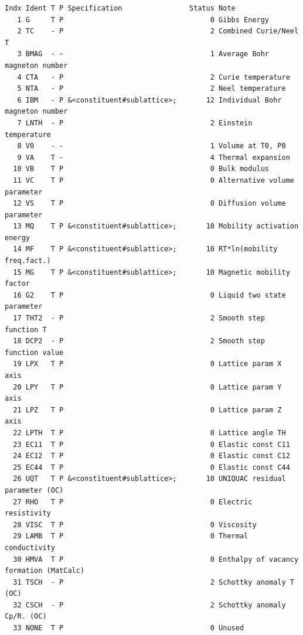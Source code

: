 \documentclass{article}
\begin{document}
\begin{appendices}
\begin{table}[!h]
{\small
\begin{verbatim}
Indx Ident T P Specification                Status Note
   1 G     T P                                   0 Gibbs Energy
   2 TC    - P                                   2 Combined Curie/Neel T
   3 BMAG  - -                                   1 Average Bohr magneton number
   4 CTA   - P                                   2 Curie temperature
   5 NTA   - P                                   2 Neel temperature
   6 IBM   - P &<constituent#sublattice>;       12 Individual Bohr magneton number
   7 LNTH  - P                                   2 Einstein temperature
   8 V0    - -                                   1 Volume at T0, P0
   9 VA    T -                                   4 Thermal expansion
  10 VB    T P                                   0 Bulk modulus
  11 VC    T P                                   0 Alternative volume parameter
  12 VS    T P                                   0 Diffusion volume parameter
  13 MQ    T P &<constituent#sublattice>;       10 Mobility activation energy
  14 MF    T P &<constituent#sublattice>;       10 RT*ln(mobility freq.fact.)
  15 MG    T P &<constituent#sublattice>;       10 Magnetic mobility factor
  16 G2    T P                                   0 Liquid two state parameter
  17 THT2  - P                                   2 Smooth step function T
  18 DCP2  - P                                   2 Smooth step function value
  19 LPX   T P                                   0 Lattice param X axis
  20 LPY   T P                                   0 Lattice param Y axis
  21 LPZ   T P                                   0 Lattice param Z axis
  22 LPTH  T P                                   0 Lattice angle TH
  23 EC11  T P                                   0 Elastic const C11
  24 EC12  T P                                   0 Elastic const C12
  25 EC44  T P                                   0 Elastic const C44
  26 UQT   T P &<constituent#sublattice>;       10 UNIQUAC residual parameter (OC)
  27 RHO   T P                                   0 Electric resistivity
  28 VISC  T P                                   0 Viscosity
  29 LAMB  T P                                   0 Thermal conductivity
  30 HMVA  T P                                   0 Enthalpy of vacancy formation (MatCalc)
  31 TSCH  - P                                   2 Schottky anomaly T (OC)
  32 CSCH  - P                                   2 Schottky anomaly Cp/R. (OC)
  33 NONE  T P                                   0 Unused
\end{verbatim}
  }
\end{table}
 

\end{appendices}
\end{document}
